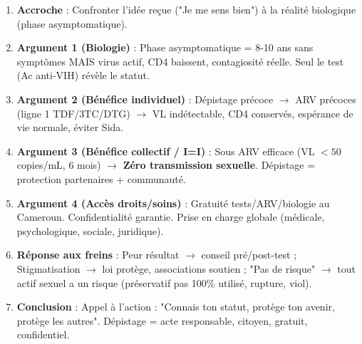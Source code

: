 \documentclass[11pt]{article}
\begin{document}
\begin{methode}
\begin{enumerate}
\item \textbf{Accroche} : Confronter l'idée reçue ("Je me sens bien") à la réalité biologique (phase asymptomatique).
\item \textbf{Argument 1 (Biologie)} : Phase asymptomatique = 8-10 ans sans symptômes MAIS virus actif, CD4 baissent, contagiosité réelle. Seul le test (Ac anti-VIH) révèle le statut.
\item \textbf{Argument 2 (Bénéfice individuel)} : Dépistage précoce $\rightarrow$ ARV précoces (ligne 1 TDF/3TC/DTG) $\rightarrow$ VL indétectable, CD4 conservés, espérance de vie normale, éviter Sida.
\item \textbf{Argument 3 (Bénéfice collectif / I=I)} : Sous ARV efficace (VL $< 50$ copies/mL, 6 mois) $\rightarrow$ \textbf{Zéro transmission sexuelle}. Dépistage = protection partenaires + communauté.
\item \textbf{Argument 4 (Accès droits/soins)} : Gratuité tests/ARV/biologie au Cameroun. Confidentialité garantie. Prise en charge globale (médicale, psychologique, sociale, juridique).
\item \textbf{Réponse aux freins} : Peur résultat $\rightarrow$ conseil pré/post-test ; Stigmatisation $\rightarrow$ loi protège, associations soutien ; "Pas de risque" $\rightarrow$ tout actif sexuel a un risque (préservatif pas 100\% utilisé, rupture, viol).
\item \textbf{Conclusion} : Appel à l'action : "Connais ton statut, protège ton avenir, protège les autres". Dépistage = acte responsable, citoyen, gratuit, confidentiel.
\end{enumerate}
\end{methode}
\end{document}
